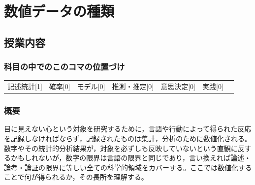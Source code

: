 \section{数値データの種類}
\label{lesson02}

\subsection{授業内容}
\subsubsection{科目の中でのこのコマの位置づけ}
\begin{tabular}[t]{ccccccc}
    記述統計[1] & 確率[0] & モデル[0] & 推測・推定[0] & 意思決定[0] & 実践[0]
\end{tabular}
\subsubsection{概要}
目に見えない心という対象を研究するために，言語や行動によって得られた反応を記録しなければならず，記録されたものは集計，分析のために数値化される。数字やその統計的分析結果が，対象を必ずしも反映していないという直観に反するかもしれないが，数字の限界は言語の限界と同じであり，言い換えれば論述・論考・論証の限界に等しい全ての科学的領域をカバーする。ここでは数値化することで何が得られるか，その長所を理解する。
